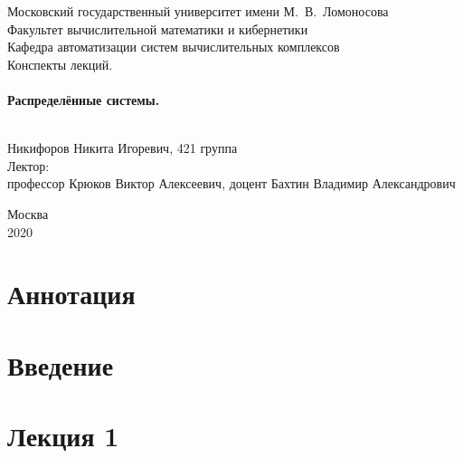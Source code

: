 \documentclass[a4paper, 12pt, titlepage, finall]{extreport}
\begin{document}
    \begin{titlepage}
        \begin{center}
            {\small \sc Московский государственный университет имени М.~В.~Ломоносова\\
            Факультет вычислительной математики и кибернетики\\
            Кафедра автоматизации систем вычислительных комплексов\\}
            \vfill
            {\large \sc Конспекты лекций.}\\~\\

            {\large \bf Распределённые системы.}\\~\\

        \end{center}
        
        \begin{flushright}
            \vfill
            \vfill
            {Никифоров Никита Игоревич, 421 группа}\\
            {Лектор:}\\
            {профессор Крюков Виктор Алексеевич, доцент Бахтин Владимир Александрович}\\
        \end{flushright}

        \begin{center}
            \vfill
            {\small Москва\\2020}
        \end{center}
    \end{titlepage}

    \chapter*{Аннотация}
    \newpage
    \tableofcontents
    \newpage
    \chapter*{Введение}
        
    \chapter{Лекция 1}
\end{document}
